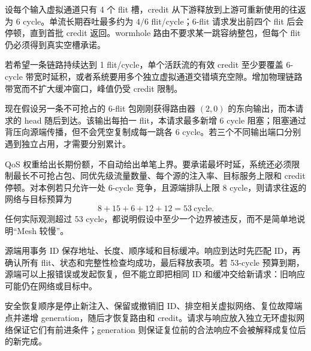 
设每个输入虚拟通道只有 4 个 flit 槽，credit 从下游释放到上游可重新使用的往返为 6 cycle。单流长期吞吐最多约为 $4/6$ flit/cycle；6-flit 请求发出前四个 flit 后会停顿，直到首批 credit 返回。wormhole 路由不要求某一跳容纳整包，但每个 flit 仍必须得到真实空槽承诺。

若希望一条链路持续达到 1 flit/cycle，单个活跃流的有效 credit 至少要覆盖 6-cycle 带宽时延积，或者系统要用多个独立虚拟通道交错填充空隙。增加物理链路带宽而不扩大缓冲窗口，峰值仍受 credit 限制。


现在假设另一条不可抢占的 6-flit 包刚刚获得路由器 $(2,0)$ 的东向输出，而本请求的 head 随后到达。该输出每拍一 flit，本请求最多新增 6 cycle 阻塞；阻塞通过背压向源端传播，但不会凭空复制成每一跳各 6 cycle。若三个不同输出端口分别遇到独立占用，才需要分别累计。

QoS 权重给出长期份额，不自动给出单笔上界。要承诺最坏时延，系统还必须限制最长不可抢占包、同优先级流量数量、每个源的注入率、目标服务上限和 credit 停顿。对本例若只允许一处 6-cycle 竞争，且源端排队上限 8 cycle，则请求往返的网络与目标预算为
\[
8+15+6+12+12=53\ \text{cycle}.
\]
任何实际观测超过 53 cycle，都说明假设中至少一个边界被违反，而不是简单地说明“Mesh 较慢”。


源端用事务 ID 保存地址、长度、顺序域和目标缓冲。响应到达时先匹配 ID，再确认所有 flit、状态和完整性检查均成功，最后释放表项。若 53-cycle 预算到期，源端可以上报错误或发起恢复，但不能立即把相同 ID 和缓冲交给新请求：旧响应可能仍在网络或目标中。

安全恢复顺序是停止新注入、保留或撤销旧 ID、排空相关虚拟网络、复位故障端点并递增 generation，随后才恢复路由和 credit。请求与响应放入独立无环虚拟网络保证它们有前进条件；generation 则保证复位前的合法响应不会被解释成复位后的新完成。
